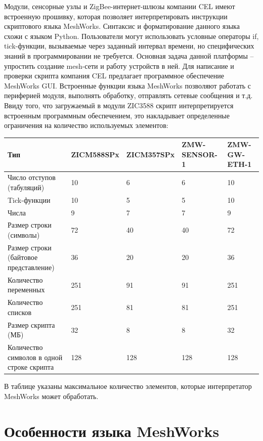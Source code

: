 \documentclass[12pt]{article}
\begin{document}
Модули, сенсорные узлы и ZigBee-интернет-шлюзы компании CEL имеют встроенную 
прошивку, которая позволяет интерпретировать инструкции скриптового языка 
MeshWorks. Синтаксис и форматирование данного языка схожи с языком Python. 
Пользователи могут использовать условные операторы if, tick-функции, вызываемые 
через заданный интервал времени, но специфических знаний в программировании не 
требуется. Основная задача данной платформы – упростить создание mesh-сети и 
работу устройств в ней.
Для написание и проверки скрипта компания CEL предлагает программное обеспечение 
MeshWorks GUI. Встроенные функции языка MeshWorks позволяют работать с периферией 
модуля, выполнять обработку, отправлять сетевые сообщения и т.д.
Ввиду того, что загружаемый в модули ZIC3588 скрипт интерпретируется встроенным 
программным обеспечением, это накладывает определенные ограничения на количество 
используемых элементов:
\begin{center}
\begin{tabular}{ |p{3cm}|p{}|p{}|p{2cm}|p{2cm}| } 
 \hline
 Тип & ZICM588SPx & ZICM357SPx & ZMW-SENSOR-1 & ZMW-GW-ETH-1 \\
 \hline
 Число отступов (табуляций) & 10 & 6 & 6 & 10 \\ 
 Tick-функции & 10 & 5 & 5 & 10 \\ 
 Числа & 9 & 7 & 7 & 9 \\ 
 Размер строки (символы) & 72 & 40 & 40 & 72 \\
 Размер строки (байтовое представление) & 36 & 20 & 20 & 36 \\
 Количество переменных & 251 & 91 & 91 & 251 \\
 Количество списков & 251 & 81 & 81 & 251 \\
 Размер скрипта (МБ) & 32 & 8 & 8 & 32 \\
 Количество символов в одной строке скрипта & 128 & 128 & 128 & 128 \\
 \hline
\end{tabular}
\end{center}
В таблице указаны максимальное количество элементов, которые интерпретатор MeshWorks может обработать.
\section{Особенности языка MeshWorks}
\end{document}
